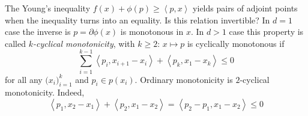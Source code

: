 \documentclass[a4paper]{article}
\newcommand{\brkt}[1]{{\left\langle #1 \right\rangle}}
\begin{document}
The Young's inequality $f(x) + \phi(p) \geq \brkt{p,x}$ yields pairs of adjoint points when the inequality turns into an equality.
Is this relation invertible? In $d=1$ case the inverse is $p=\partial \phi(x)$ is monotonous in $x$.
In $d>1$ case this property is called \emph{$k$-cyclical monotonicity}, with $k\geq2$: $x\mapsto p$ is cyclically monotonous if
\[ \sum_{i=1}^{k-1} \brkt{p_i, x_{i+1}-x_i} + \brkt{p_k, x_1-x_k} \leq 0\]
for all any $\big(x_i\big)_{i=1}^k$ and $p_i \in p(x_i)$.
Ordinary monotonicity is $2$-cyclical monotonicity. Indeed, 
\[\brkt{p_1, x_2-x_1}+\brkt{p_2, x_1- x_2} = \brkt{p_2-p_1, x_1-x_2}\leq 0\]



\end{document}
